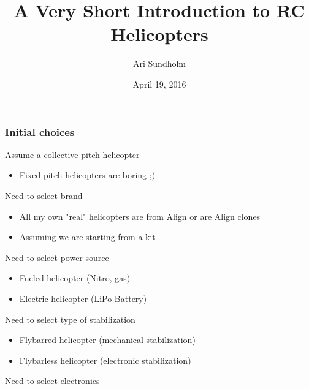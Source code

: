 \documentclass{beamer}
\title{A Very Short Introduction to RC Helicopters}
\author{Ari Sundholm}
\date{April 19, 2016}
\begin{document}
 
\frame{\titlepage}

\begin{frame}
\frametitle{Initial choices}

Assume a collective-pitch helicopter
\begin{itemize}
	\item Fixed-pitch helicopters are boring ;)
\end{itemize}

Need to select brand
\begin{itemize}
	\item All my own "real" helicopters are from Align or are Align clones
	\item Assuming we are starting from a kit
\end{itemize}

Need to select power source
\begin{itemize}
	\item Fueled helicopter (Nitro, gas)
	\item Electric helicopter (LiPo Battery)
\end{itemize}

Need to select type of stabilization
\begin{itemize}
	\item Flybarred helicopter (mechanical stabilization)
	\item Flybarless helicopter (electronic stabilization)
\end{itemize}

Need to select electronics

\end{frame}
\end{document}
